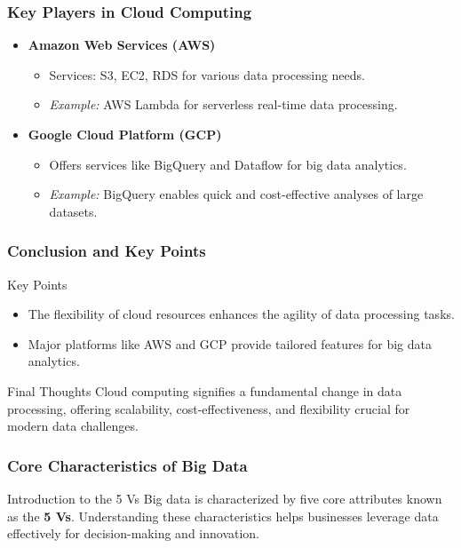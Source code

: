 \documentclass[aspectratio=169]{beamer}
\begin{document}
\begin{frame}[fragile]
    \frametitle{Key Players in Cloud Computing}
    \begin{itemize}
        \item \textbf{Amazon Web Services (AWS)}
            \begin{itemize}
                \item Services: S3, EC2, RDS for various data processing needs.
                \item \textit{Example:} AWS Lambda for serverless real-time data processing.
            \end{itemize}

        \item \textbf{Google Cloud Platform (GCP)}
            \begin{itemize}
                \item Offers services like BigQuery and Dataflow for big data analytics.
                \item \textit{Example:} BigQuery enables quick and cost-effective analyses of large datasets.
            \end{itemize}
    \end{itemize}
\end{frame}

\begin{frame}[fragile]
    \frametitle{Conclusion and Key Points}
    \begin{block}{Key Points}
        \begin{itemize}
            \item The flexibility of cloud resources enhances the agility of data processing tasks.
            \item Major platforms like AWS and GCP provide tailored features for big data analytics.
        \end{itemize}
    \end{block}
    \begin{block}{Final Thoughts}
        Cloud computing signifies a fundamental change in data processing, offering scalability, cost-effectiveness, and flexibility crucial for modern data challenges.
    \end{block}
\end{frame}

\begin{frame}[fragile]
    \frametitle{Core Characteristics of Big Data}
    \begin{block}{Introduction to the 5 Vs}
        Big data is characterized by five core attributes known as the \textbf{5 Vs}. Understanding these characteristics helps businesses leverage data effectively for decision-making and innovation.
    \end{block}
\end{frame}
\end{document}
